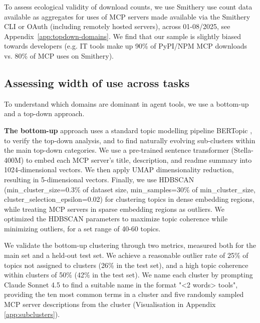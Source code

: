 \documentclass[manuscript,screen,nonacm,oneside]{acmart}
\begin{document}
To assess ecological validity of download counts, we use Smithery use count data available as aggregates for uses of MCP servers made available via the Smithery CLI or OAuth (including remotely hosted servers), across 01-08/2025, see Appendix~\ref{app:topdown-domains}. We find that our sample is slightly biased towards developers (e.g. IT tools make up 90\% of PyPI/NPM MCP downloads vs. 80\% of MCP uses on Smithery).


\subsection{Assessing width of use across tasks}
\label{sec:topic-modelling}

To understand which domains are dominant in agent tools, we use a bottom-up and a top-down approach.

\textbf{The bottom-up} approach uses a standard topic modelling pipeline BERTopic \citep{grootendorst2022bertopic}, to verify the top-down analysis, and to find naturally evolving sub-clusters within the main top-down categories.
We use a pre-trained sentence transformer (Stella-400M) to embed each MCP server's title, description, and readme summary into 1024-dimensional vectors. We then apply UMAP dimensionality reduction, resulting in 5-dimensional vectors. Finally, we use HDBSCAN (min\_cluster\_size=0.3\% of dataset size, min\_samples=30\% of min\_cluster\_size, cluster\_selection\_epsilon=0.02) for clustering topics in dense embedding regions, while treating MCP servers in sparse embedding regions as outliers. We optimized the HDBSCAN parameters to maximize topic coherence while minimizing outliers, for a set range of 40-60 topics.

We validate the bottom-up clustering through two metrics, measured both for the main set and a held-out test set. We achieve a reasonable outlier rate of 25\% of topics not assigned to clusters (26\% in the test set), and a high topic coherence \citep{roder2015exploring} within clusters of 50\% (42\% in the test set). We name each cluster by prompting Claude Sonnet 4.5 to find a suitable name in the format "\textless2 words\textgreater{} tools", providing the ten most common terms in a cluster and five randomly sampled MCP server descriptions from the cluster (Visualisation in Appendix \ref{app:subclusters}).
\end{document}
